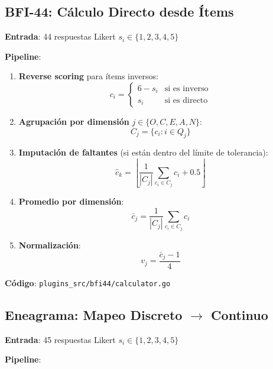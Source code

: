 \documentclass[12pt,a4paper]{article}
\begin{document}
\subsection{BFI-44: Cálculo Directo desde Ítems}
\label{subsec:bfi44}

\textbf{Entrada}: 44 respuestas Likert $s_i \in \{1, 2, 3, 4, 5\}$

\textbf{Pipeline}:

\begin{enumerate}
    \item \textbf{Reverse scoring} para ítems inversos:
    \[
    c_i = \begin{cases} 6 - s_i & \text{si es inverso} \\ s_i & \text{si es directo} \end{cases}
    \]
    
    \item \textbf{Agrupación por dimensión} $j \in \{O, C, E, A, N\}$:
    \[
    C_j = \{c_i : i \in Q_j\}
    \]
    
    \item \textbf{Imputación de faltantes} (si están dentro del límite de tolerancia):
    \[
    \hat{c}_k = \left\lfloor \frac{1}{|C_j|} \sum_{c_i \in C_j} c_i + 0.5 \right\rfloor
    \]
    
    \item \textbf{Promedio por dimensión}:
    \[
    \bar{c}_j = \frac{1}{|C_j|} \sum_{c_i \in C_j} c_i
    \]
    
    \item \textbf{Normalización}:
    \[
    v_j = \frac{\bar{c}_j - 1}{4}
    \]
\end{enumerate}

\textbf{Código}: \texttt{plugins\_src/bfi44/calculator.go}

\subsection{Eneagrama: Mapeo Discreto $\to$ Continuo}
\label{subsec:enneagram}

\textbf{Entrada}: 45 respuestas Likert $s_i \in \{1, 2, 3, 4, 5\}$

\textbf{Pipeline}:
\end{document}
